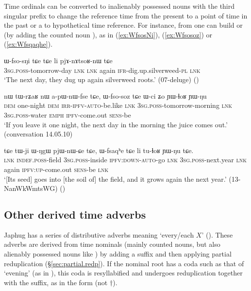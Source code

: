   
Time ordinals can be converted to inalienably possessed nouns with the third singular prefix  to change the reference time from the present to a point of time in the past or a to hypothetical time reference. For instance,  from  one can build  or  (by adding the counted noun ), as in (\ref{ex:WfsosNi}), (\ref{ex:Wfsosoz}) or (\ref{ex:Wfsqaqhe}).

\begin{exe}
\ex \label{ex:WfsosNi}
\gll  ɯ-fso-sŋi tɕe tɕe li pjɤ-nɤtsoʁ-nɯ tɕe \\ 
 \textsc{3sg}.\textsc{poss}-tomorrow-day \textsc{lnk} \textsc{lnk} again \textsc{ifr}-dig.up.silverweed-\textsc{pl}  \textsc{lnk}\\
\glt `The next day, they dug up again silverweed roots.' (07-deluge) ()
\end{exe}
  
\begin{exe}
\ex \label{ex:Wfsosoz}
\gll nɯ tɯ-rʑaʁ nɯ a-pɯ-nɯ-fse tɕe, ɯ-fso-soz tɕe ɯ-ci ʑo ɲɯ-ɬoʁ ɲɯ-ŋu  \\
 \textsc{dem} one-night \textsc{dem} \textsc{irr}-\textsc{ipfv}-\textsc{auto}-be.like \textsc{lnk} \textsc{3sg}.\textsc{poss}-tomorrow-morning \textsc{lnk} \textsc{3sg}.\textsc{poss}-water \textsc{emph} \textsc{ipfv}-come.out \textsc{sens}-be \\
\glt `If you leave it one night, the next day in the morning the juice comes out.' (conversation 14.05.10)
\end{exe}
   
\begin{exe}
\ex \label{ex:Wfsqaqhe}
\gll   tɕe tɯ-ji ɯ-ŋgɯ pjɯ-nɯ-ɕe tɕe, ɯ-fsaqʰe tɕe li tu-ɬoʁ ɲɯ-ŋu tɕe.   \\
 \textsc{lnk} \textsc{indef}.\textsc{poss}-field \textsc{3sg}.\textsc{poss}-inside \textsc{ipfv}:\textsc{down}-\textsc{auto}-go  \textsc{lnk} \textsc{3sg}.\textsc{poss}-next.year \textsc{lnk} again \textsc{ipfv}:\textsc{up}-come.out \textsc{sens}-be \textsc{lnk}  \\
\glt `[Its seed] goes into [the soil of] the field, and it grows again the next year.' (13-NanWkWmtsWG)
()
\end{exe}

 \subsection{Other derived time adverbs} \label{sec:time.adv}
Japhug has a series of distributive adverbs meaning `every/each $X$' (). These adverbs are derived from time nominals (mainly counted nouns, but also alienably possessed nouns like ) by adding a suffix  and then applying partial reduplication (§\ref{sec:partial.redp}). If the nominal root has a coda such as that of  `evening' (as in ), this coda is resyllabified and undergoes reduplication together with the suffix, as in the form  (not $\dagger$). 

